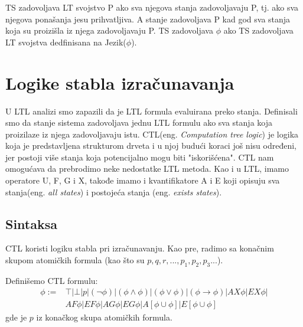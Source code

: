 \documentclass[a4paper]{article}
\begin{document}
{	TS zadovoljava LT svojstvo P ako sva njegova stanja zadovoljavaju P, tj. ako sva njegova ponašanja jesu prihvatljiva. A stanje zadovoljava P kad god sva stanja koja su proizišla iz njega zadovoljavaju P.\newline
	TS zadovoljava $\phi$ ako TS zadovoljava LT svojstva dedfinisana na Jezik($\phi$).\cite{reeves1990logic}


	\section{Logike stabla izračunavanja}
	\label{sec:CTL}
	U LTL analizi smo zapazili da je LTL formula evaluirana preko stanja. Definisali smo da stanje sistema
	zadovoljava jednu LTL formulu ako sva stanja koja proizilaze iz njega zadovoljavaju istu. CTL(eng. \emph{Computation tree logic}) je logika koja je predstavljena strukturom drveta i u njoj budući koraci još nisu
	određeni, jer postoji više stanja koja potencijalno mogu biti "iskorišćena".
	CTL nam omogućava da prebrodimo neke nedostatke LTL metoda. Kao i u LTL, imamo operatore U, F, G i X, takođe imamo i kvantifikatore
	A i E koji opisuju sva stanja(eng. \emph{all states}) i postojeća stanja (eng. \emph{exists states}). 

\subsection{Sintaksa}
	\label{subsec:podnaslovN}
	CTL koristi logiku stabla pri izračunavanju. 
	Kao pre, radimo sa konačnim skupom atomičkih formula (kao što su $p, q, r,...,p_1,p_2,p_3...$).

	Definišemo CTL formulu:
\begin{equation}
\begin{split}
\phi := &\top| \bot | p | (\neg \phi) | (\phi \wedge \phi) | (\phi \vee \phi) | (\phi \rightarrow \phi)| AX\phi | EX\phi | \\
          &  AF\phi | EF\phi | AG\phi | EG\phi | A[\phi \cup \phi] | E[\phi \cup \phi]
\end{split}
\end{equation}
	gde je $p$ iz konačkog skupa atomičkih formula.
	\newline
	
}
\end{document}
